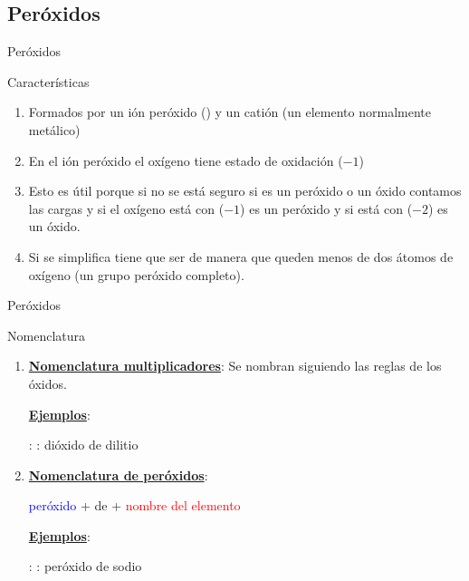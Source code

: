 \documentclass{beamer}
\newcommand{\nline}[1][6pt]{\\[#1]}
\begin{document}
\subsection{Peróxidos}

\begin{frame}[t]{Peróxidos}
    \begin{block}{\Large Características}\vspace*{5pt}
        \begin{enumerate}[label=\itembolascolor{\arabic*}{mDarkTeal}]
            \item Formados por un ión peróxido () y un catión (un elemento normalmente metálico)
            \item En el ión peróxido el oxígeno tiene estado de oxidación ($-1$)
            \item Esto es útil porque si no se está seguro si es un peróxido o un óxido contamos las cargas y si el oxígeno está con ($-1$) es un peróxido y si está con ($-2$) es un óxido.
            \item Si se simplifica tiene que ser de manera que  queden menos de dos átomos de oxígeno (un grupo peróxido completo).
        \end{enumerate}

    \end{block}
\end{frame}


\begin{frame}[t]{Peróxidos}
    \begin{alertblock}{\Large Nomenclatura}\vspace*{5pt}
        \begin{enumerate}[label=\itembolascolor{\arabic*}{mDarkTeal}]
            \item \textbf{\uline{Nomenclatura multiplicadores}}: Se nombran siguiendo las reglas de los óxidos.

                  \textbf{\uline{Ejemplos}}:\nline{}

                   : : dióxido de dilitio
            \item \textbf{\uline{Nomenclatura de peróxidos}}:
                  \begin{center}
                      \textcolor{blue}{peróxido} + de + \textcolor{red}{nombre del elemento}
                  \end{center}

                  \textbf{\uline{Ejemplos}}:\nline{}

                   : : peróxido de sodio
        \end{enumerate}

    \end{alertblock}
\end{frame}
\end{document}
